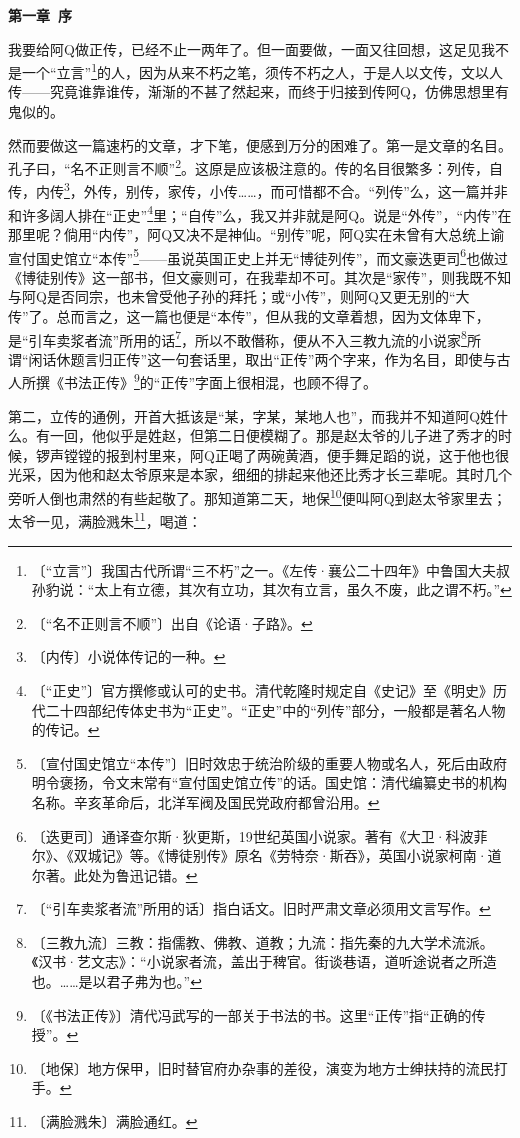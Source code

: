 \documentclass[12pt,UTF-8,openany]{ctexbook}
\begin{document}
\begin{large}
    
    \begin{center}\textbf{第一章~序}\end{center}
    
    我要给阿Q做正传，已经不止一两年了。但一面要做，一面又往回想，这足见我不是一个“立言”\footnote{〔“立言”〕我国古代所谓“三不朽”之一。《左传·襄公二十四年》中鲁国大夫叔孙豹说：“太上有立德，其次有立功，其次有立言，虽久不废，此之谓不朽。”}的人，因为从来不朽之笔，须传不朽之人，于是人以文传，文以人传——究竟谁靠谁传，渐渐的不甚了然起来，而终于归接到传阿Q，仿佛思想里有鬼似的。
    
    然而要做这一篇速朽的文章，才下笔，便感到万分的困难了。第一是文章的名目。孔子曰，“名不正则言不顺”\footnote{〔“名不正则言不顺”〕出自《论语·子路》。}。这原是应该极注意的。传的名目很繁多：列传，自传，内传\footnote{〔内传〕小说体传记的一种。}，外传，别传，家传，小传……，而可惜都不合。“列传”么，这一篇并非和许多阔人排在“正史”\footnote{〔“正史”〕官方撰修或认可的史书。清代乾隆时规定自《史记》至《明史》历代二十四部纪传体史书为“正史”。“正史”中的“列传”部分，一般都是著名人物的传记。}里；“自传”么，我又并非就是阿Q。说是“外传”，“内传”在那里呢？倘用“内传”，阿Q又决不是神仙。“别传”呢，阿Q实在未曾有大总统上谕宣付国史馆立“本传”\footnote{〔宣付国史馆立“本传”〕旧时效忠于统治阶级的重要人物或名人，死后由政府明令褒扬，令文末常有“宣付国史馆立传”的话。国史馆：清代编纂史书的机构名称。辛亥革命后，北洋军阀及国民党政府都曾沿用。}——虽说英国正史上并无“博徒列传”，而文豪迭更司\footnote{〔迭更司〕通译查尔斯·狄更斯，19世纪英国小说家。著有《大卫·科波菲尔》、《双城记》等。《博徒别传》原名《劳特奈·斯吞》，英国小说家柯南·道尔著。此处为鲁迅记错。}也做过《博徒别传》这一部书，但文豪则可，在我辈却不可。其次是“家传”，则我既不知与阿Q是否同宗，也未曾受他子孙的拜托；或“小传”，则阿Q又更无别的“大传”了。总而言之，这一篇也便是“本传”，但从我的文章着想，因为文体卑下，是“引车卖浆者流”所用的话\footnote{〔“引车卖浆者流”所用的话〕指白话文。旧时严肃文章必须用文言写作。}，所以不敢僭称，便从不入三教九流的小说家\footnote{〔三教九流〕三教：指儒教、佛教、道教；九流：指先秦的九大学术流派。《汉书·艺文志》：“小说家者流，盖出于稗官。街谈巷语，道听途说者之所造也。……是以君子弗为也。”}所谓“闲话休题言归正传”这一句套话里，取出“正传”两个字来，作为名目，即使与古人所撰《书法正传》\footnote{〔《书法正传》〕清代冯武写的一部关于书法的书。这里“正传”指“正确的传授”。}的“正传”字面上很相混，也顾不得了。
    
    第二，立传的通例，开首大抵该是“某，字某，某地人也”，而我并不知道阿Q姓什么。有一回，他似乎是姓赵，但第二日便模糊了。那是赵太爷的儿子进了秀才的时候，锣声镗镗的报到村里来，阿Q正喝了两碗黄酒，便手舞足蹈的说，这于他也很光采，因为他和赵太爷原来是本家，细细的排起来他还比秀才长三辈呢。其时几个旁听人倒也肃然的有些起敬了。那知道第二天，地保\footnote{〔地保〕地方保甲，旧时替官府办杂事的差役，演变为地方士绅扶持的流民打手。}便叫阿Q到赵太爷家里去；太爷一见，满脸溅朱\footnote{〔满脸溅朱〕满脸通红。}，喝道：
    

\end{large}
\end{document}
